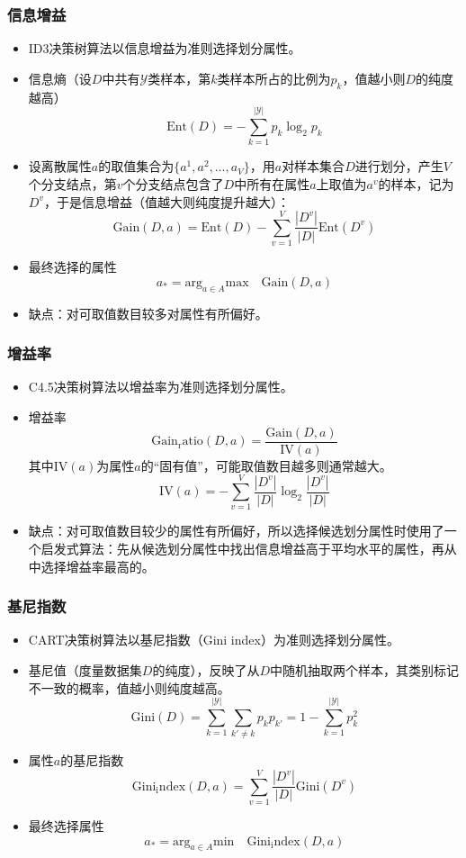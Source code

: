 \documentclass{ctexart}
\begin{document}
					\subsubsection{信息增益}
						\begin{itemize}
							\item ID3决策树算法以信息增益为准则选择划分属性。
							\item 信息熵（设$D$中共有$\mathcal{Y}$类样本，第$k$类样本所占的比例为$p_k$，值越小则$D$的纯度越高）\[\mathrm{Ent}(D)=-\sum_{k=1}^{|\mathcal{Y}|}p_k\log_2p_k\]
							\item 设离散属性$a$的取值集合为$\{a^1,a^2,\dots,a_V\}$，用$a$对样本集合$D$进行划分，产生$V$个分支结点，第$v$个分支结点包含了$D$中所有在属性$a$上取值为$a^v$的样本，记为$D^v$，于是信息增益（值越大则纯度提升越大）：\[\mathrm{Gain}(D,a)=\mathrm{Ent}(D)-\sum_{v=1}^{V}\frac{|D^v|}{|D|}\mathrm{Ent}(D^v)\]
							\item 最终选择的属性\[a_*=\mathrm{arg}_{a\in A}\mathrm{max}\quad\mathrm{Gain}(D,a)\]
							\item 缺点：对可取值数目较多对属性有所偏好。
						\end{itemize}
					\subsubsection{增益率}
						\begin{itemize}
							\item C4.5决策树算法以增益率为准则选择划分属性。
							\item 增益率\[\mathrm{Gain_ratio}(D,a)=\frac{\mathrm{Gain}(D,a)}{\mathrm{IV}(a)}\]其中$\mathrm{IV}(a)$为属性$a$的``固有值''，可能取值数目越多则通常越大。\[\mathrm{IV}(a)=-\sum_{v=1}^{V}\frac{|D^v|}{|D|}\log_2\frac{|D^v|}{|D|}\]
							\item 缺点：对可取值数目较少的属性有所偏好，所以选择候选划分属性时使用了一个启发式算法：先从候选划分属性中找出信息增益高于平均水平的属性，再从中选择增益率最高的。
						\end{itemize}
					\subsubsection{基尼指数}
						\begin{itemize}
							\item CART决策树算法以基尼指数（Gini index）为准则选择划分属性。
							\item 基尼值（度量数据集$D$的纯度），反映了从$D$中随机抽取两个样本，其类别标记不一致的概率，值越小则纯度越高。\[\mathrm{Gini}(D)=\sum_{k=1}^{|\mathcal{Y}|}\sum_{k'\neq k}^{}p_kp_{k'}=1-\sum_{k=1}^{|\mathcal{Y}|}p_k^2\]
							\item 属性$a$的基尼指数\[\mathrm{Gini_index}(D,a)=\sum_{v=1}^{V}\frac{|D^v|}{|D|}\mathrm{Gini}(D^v)\]
							\item 最终选择属性\[a_*=\mathrm{arg}_{a\in A}\mathrm{min}\quad\mathrm{Gini_index}(D,a)\]
						\end{itemize}
\end{document}
